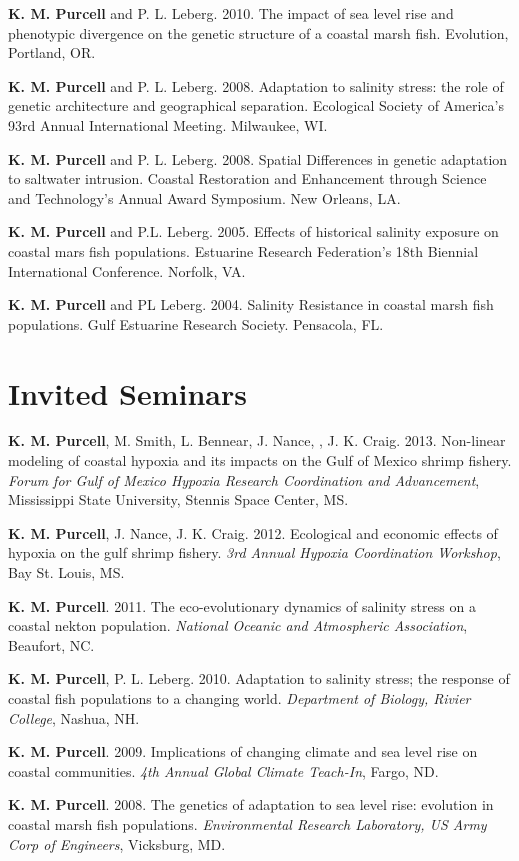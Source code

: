 \documentclass[letterpaper]{article}
\renewenvironment{itemize}{
  \begin{list}{}{
    \setlength{\leftmargin}{1em}
  }
}{
  \end{list}
}
\begin{document}
\begin{itemize}
		\item \textbf{K. M. Purcell} and P. L. Leberg. 2010. The impact of sea level rise and phenotypic divergence on the genetic structure of a coastal marsh fish. Evolution, Portland, OR.
		\item \textbf{K. M. Purcell} and P. L. Leberg. 2008. Adaptation to salinity stress: the role of genetic architecture and geographical separation. Ecological Society of America’s 93rd Annual International Meeting. Milwaukee, WI.
		\item \textbf{K. M. Purcell} and P. L. Leberg. 2008. Spatial Differences in genetic adaptation to saltwater intrusion. Coastal Restoration and Enhancement through Science and Technology’s Annual Award Symposium. New Orleans, LA.
		\item \textbf{K. M. Purcell} and P.L. Leberg. 2005. Effects of historical salinity exposure on coastal mars fish populations. Estuarine Research Federation’s 18th Biennial International Conference. Norfolk, VA.
		\item \textbf{K. M. Purcell} and PL Leberg. 2004. Salinity Resistance in coastal marsh fish populations. Gulf Estuarine Research Society. Pensacola, FL.
	\end{itemize}

\section*{Invited Seminars}
	\begin{itemize}
		 \item \textbf{K. M. Purcell}, M. Smith, L. Bennear, J. Nance, , J. K. Craig. 2013. Non-linear modeling of coastal hypoxia and its impacts on the Gulf of Mexico shrimp fishery. \textit{Forum for Gulf of Mexico Hypoxia Research Coordination and Advancement}, Mississippi State University, Stennis Space Center, MS.
		 \item \textbf{K. M. Purcell}, J. Nance, J. K. Craig. 2012. Ecological and economic effects of hypoxia on the gulf shrimp fishery. \textit{3rd Annual Hypoxia Coordination Workshop}, Bay St. Louis, MS.
		 \item \textbf{K. M. Purcell}. 2011. The eco-evolutionary dynamics of salinity stress on a coastal nekton population. \textit{National Oceanic and Atmospheric Association}, Beaufort, NC.
		 \item \textbf{K. M. Purcell}, P. L. Leberg. 2010. Adaptation to salinity stress; the response of coastal fish populations to a changing world. \textit{Department of Biology, Rivier College}, Nashua, NH.
		 \item \textbf{K. M. Purcell}. 2009. Implications of changing climate and sea level rise on coastal communities. \textit{4th Annual Global Climate Teach-In}, Fargo, ND.
		 \item \textbf{K. M. Purcell}. 2008. The genetics of adaptation to sea level rise: evolution in coastal marsh fish populations. \textit{Environmental Research Laboratory, US Army Corp of Engineers}, Vicksburg, MD.
	\end{itemize}
\end{document}

